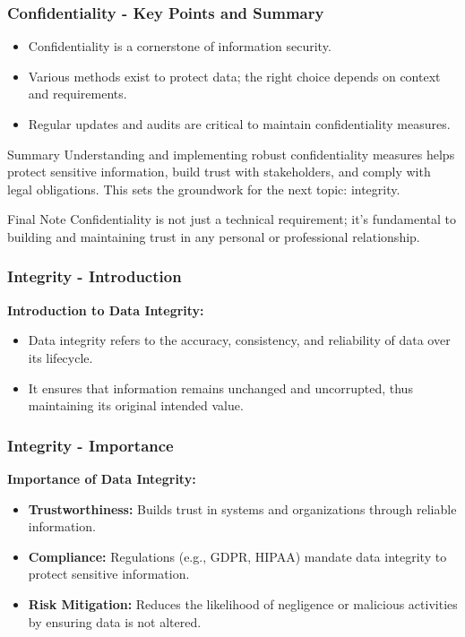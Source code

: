 \documentclass{beamer}
\begin{document}
\begin{frame}[fragile]
    \frametitle{Confidentiality - Key Points and Summary}
    \begin{itemize}
        \item Confidentiality is a cornerstone of information security.
        
        \item Various methods exist to protect data; the right choice depends on context and requirements.
        
        \item Regular updates and audits are critical to maintain confidentiality measures.
    \end{itemize}
    
    \begin{block}{Summary}
        Understanding and implementing robust confidentiality measures helps protect sensitive information, build trust with stakeholders, and comply with legal obligations. This sets the groundwork for the next topic: integrity.
    \end{block}
    
    \begin{block}{Final Note}
        Confidentiality is not just a technical requirement; it's fundamental to building and maintaining trust in any personal or professional relationship.
    \end{block}
\end{frame}

\begin{frame}[fragile]
    \frametitle{Integrity - Introduction}
    \textbf{Introduction to Data Integrity:}
    \begin{itemize}
        \item Data integrity refers to the accuracy, consistency, and reliability of data over its lifecycle. 
        \item It ensures that information remains unchanged and uncorrupted, thus maintaining its original intended value.
    \end{itemize}
\end{frame}

\begin{frame}[fragile]
    \frametitle{Integrity - Importance}
    \textbf{Importance of Data Integrity:}
    \begin{itemize}
        \item \textbf{Trustworthiness:} Builds trust in systems and organizations through reliable information.
        \item \textbf{Compliance:} Regulations (e.g., GDPR, HIPAA) mandate data integrity to protect sensitive information.
        \item \textbf{Risk Mitigation:} Reduces the likelihood of negligence or malicious activities by ensuring data is not altered.
    \end{itemize}
\end{frame}
\end{document}
